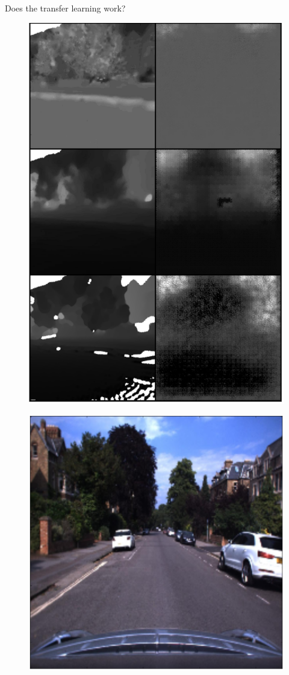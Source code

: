 \begin{frame}{Does the transfer learning work?}
\begin{minipage}[c]{0.24\linewidth}
\begin{figure}[c]
			\includegraphics[width=\linewidth]{images/mod3.png}			
		\end{figure}
	\end{minipage}
	\hfill
	\begin{minipage}[c]{0.24\linewidth}
		\begin{figure}[c]
			\includegraphics[width=0.5\linewidth]{images/rgb4.png}
		

\end{figure}
\end{minipage}
\end{frame}
